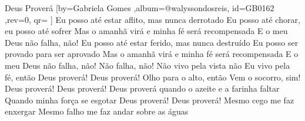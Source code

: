 \beginsong
{Deus Proverá %
}[by={Gabriela Gomes  %
},album={@walyssondosreis},
id={GB0162 %
},rev={0}, %
qr={ %
}]
\beginverse
Eu posso até estar aflito, mas nunca derrotado
Eu posso até chorar, eu posso até sofrer
Mas o amanhã virá e minha fé será recompensada
E o meu Deus não falha, não!
\endverse
\beginverse
Eu posso até estar ferido, mas nunca destruído
Eu posso ser provado para ser aprovado
Mas o amanhã virá e minha fé será recompensada
E o meu Deus não falha, não!
Não falha, não!
\endverse
\beginverse
Não vivo pela vista não
Eu vivo pela fé, então
Deus proverá! Deus proverá!
Olho para o alto, então
Vem o socorro, sim!
Deus proverá! Deus proverá!
\endverse
\beginchorus
Deus proverá quando o azeite e a farinha faltar
Quando minha força se esgotar
Deus proverá! Deus proverá!
Mesmo cego me faz enxergar
Mesmo falho me faz andar sobre as águas
\endchorus
\begin{comment}
\lstset{basicstyle=\scriptsize\bf} %
\tab{Solo 1}
\begin{lstlisting}
E|-----------------------------------------------------|
B|-----------------------------------------------------|
G|-----------------------------------------------------|
D|-----------------------------------------------------|
A|-----------------------------------------------------|
E|-----------------------------------------------------|
\end{lstlisting}
\end{comment}
\vspace{2em} 
\color{act-gray}%
\color{act-gray}%
\color{act-gray}%
